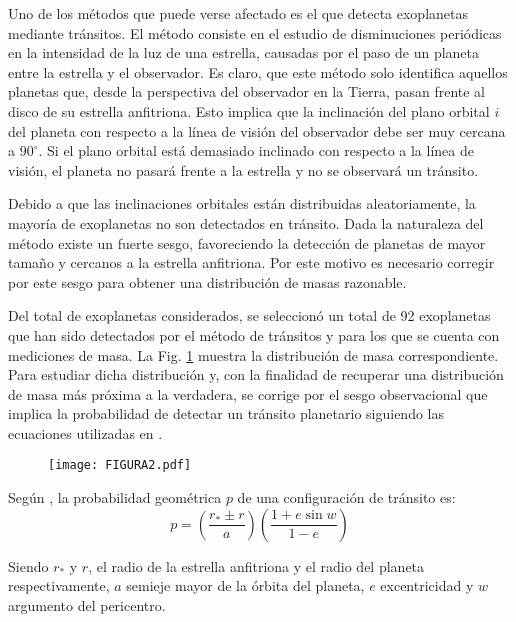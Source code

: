 \documentclass[baaa]{baaa}
\begin{document}
Uno de los métodos que puede verse afectado es el que detecta exoplanetas mediante tránsitos. El método consiste en el estudio de disminuciones periódicas en la intensidad de la luz de una estrella, causadas por el paso de un planeta entre la estrella y el observador. 
Es claro, que este método solo identifica aquellos planetas que, desde la perspectiva del observador en la Tierra, pasan frente al disco de su estrella anfitriona. Esto implica que la inclinación del plano orbital $i$ del planeta con respecto a la línea de visión del observador debe ser muy cercana a $90^{\circ}$. Si el plano orbital está demasiado inclinado con respecto a la línea de visión, el planeta no pasará frente a la estrella y no se observará un tránsito. 

Debido a que las inclinaciones orbitales están distribuidas aleatoriamente, la mayoría de exoplanetas no son detectados en tránsito. Dada la naturaleza del método existe un fuerte sesgo, favoreciendo la detección de planetas de mayor tamaño y cercanos a la estrella anfitriona. Por este motivo es necesario corregir por este sesgo para obtener una distribución de masas razonable.  

Del total de exoplanetas considerados, se seleccionó un total de 92 exoplanetas que han sido detectados por el método de tránsitos y para los que se cuenta con mediciones de masa. La Fig. \ref{Figura 3} muestra la distribución de masa correspondiente. Para estudiar dicha distribución y, con la finalidad de recuperar una distribución de masa más próxima a la verdadera, se corrige por el sesgo observacional que implica la probabilidad de detectar un tránsito planetario siguiendo las ecuaciones utilizadas en \citet{ananyeva2020}.

\begin{figure}[!t]
\centering
\texttt{[image: FIGURA2.pdf]}
\label{Figura 3}
\end{figure}

Según \citet{winn2014}, la probabilidad geométrica $p$ de una configuración de tránsito es: 
\vspace{2mm}
\begin{equation}
p=\left(\frac{r_{*} \pm r}{a}\right)\left(\frac{1 + e \sin w}{1-e}\right)
\end{equation}
\vspace{2mm}

Siendo $r_{*}$ y $r$, el radio de la estrella anfitriona y el radio del planeta respectivamente, $a$ semieje mayor de la órbita del planeta, $e$ excentricidad y $w$ argumento del pericentro.   
\end{document}
